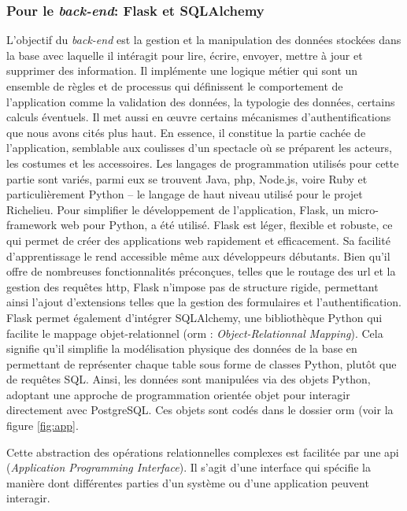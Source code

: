\subsubsection{Pour le \textit{back-end}: Flask et SQLAlchemy}
L'objectif du \textit{back-end} est la gestion et la manipulation des données stockées dans la base avec laquelle il intéragit pour lire, écrire, envoyer, mettre à jour et supprimer des information. Il implémente une logique métier qui sont un ensemble de règles et de processus qui définissent le comportement de l'application comme la validation des données, la typologie des données, certains calculs éventuels. Il met aussi en œuvre certains mécanismes d'authentifications que nous avons cités plus haut. En essence, il constitue la partie cachée de l'application, semblable aux coulisses d'un spectacle où se préparent les acteurs, les costumes et les accessoires. Les langages de programmation utilisés pour cette partie sont variés, parmi eux se trouvent Java, \acrshort{php}, Node.js, voire Ruby et particulièrement Python -- le langage de haut niveau utilisé pour le projet Richelieu. Pour simplifier le développement de l'application, Flask, un micro-framework web pour Python, a été utilisé. Flask est léger, flexible et robuste, ce qui permet de créer des applications web rapidement et efficacement. Sa facilité d'apprentissage le rend accessible même aux développeurs débutants. Bien qu'il offre de nombreuses fonctionnalités préconçues, telles que le routage des \acrshort{url} et la gestion des requêtes \acrshort{http}, Flask n'impose pas de structure rigide, permettant ainsi l'ajout d'extensions telles que la gestion des formulaires et l'authentification. Flask permet également d'intégrer SQLAlchemy, une bibliothèque Python qui facilite le mappage objet-relationnel (\acrshort{orm} : \textit{Object-Relationnal Mapping}). Cela signifie qu'il simplifie la modélisation physique des données de la base en permettant de représenter chaque table sous forme de classes Python, plutôt que de requêtes SQL. Ainsi, les données sont manipulées via des objets Python, adoptant une approche de programmation orientée objet pour interagir directement avec PostgreSQL. Ces objets sont codés dans le dossier \acrshort{orm} (voir la figure \ref{fig:app}.

Cette abstraction des opérations relationnelles complexes est facilitée par une \acrshort{api} (\textit{Application Programming Interface}). Il s'agit d'une interface qui spécifie la manière dont différentes parties d'un système ou d'une application peuvent interagir. 

